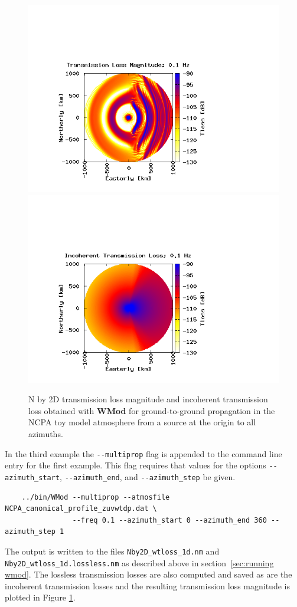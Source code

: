 \begin{figure}[h]
\begin{center}
\includegraphics[scale=0.45,trim = 70 20 180 140,clip]{figs/wmod_ex3}
\includegraphics[scale=0.45,trim = 70 20 180 140,clip]{figs/wmod_ex3_inco}
\end{center}
\caption{N by 2D transmission loss magnitude and incoherent transmission loss obtained with {\bf WMod} for ground-to-ground propagation in the NCPA toy model atmosphere from a source at the origin to all azimuths.}
\label{fig: wmod Nby2D tl}
\end{figure}

In the third example the \verb+--multiprop+ flag is appended to the command line entry for the first example. This flag requires that values for the options \verb+--azimuth_start+, \verb+--azimuth_end+, and \verb+--azimuth_step+ be given. 
\begin{verbatim} 
    ../bin/WMod --multiprop --atmosfile NCPA_canonical_profile_zuvwtdp.dat \
                --freq 0.1 --azimuth_start 0 --azimuth_end 360 --azimuth_step 1
\end{verbatim}
The output is written to the files \verb+Nby2D_wtloss_1d.nm+ and \verb+Nby2D_wtloss_1d.lossless.nm+ as described above in section~\ref{sec:running wmod}. The lossless transmission losses are also computed and saved as are the incoherent transmission losses and the resulting transmission loss magnitude is plotted in Figure \ref{fig: wmod Nby2D tl}. 
